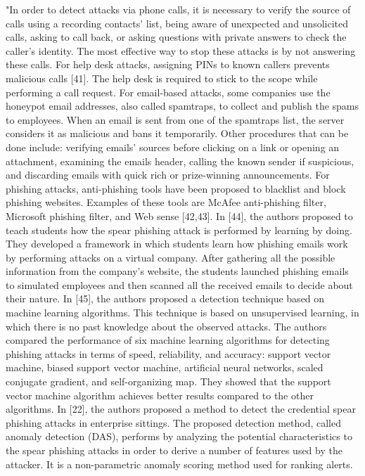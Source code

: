 "In order to detect attacks via phone calls, it is necessary to verify the source of calls using a recording contacts’ list, being aware of unexpected and unsolicited calls, asking to call back, or asking questions with private answers to check the caller’s identity. The most effective way to stop these attacks is by not answering these calls. For help desk attacks, assigning PINs to known callers prevents malicious calls [41]. The help desk is required to stick to the scope while performing a call request. For email-based attacks, some companies use the honeypot email addresses, also called spamtraps, to collect and publish the spams to employees. When an email is sent from one of the spamtraps list, the server considers it as malicious and bans it temporarily. Other procedures that can be done include: verifying emails’ sources before clicking on a link or opening an attachment, examining the emails header, calling the known sender if suspicious, and discarding emails with quick rich or prize-winning announcements.
For phishing attacks, anti-phishing tools have been proposed to blacklist and block phishing websites. Examples of these tools are McAfee anti-phishing filter, Microsoft phishing filter, and Web sense [42,43]. In [44], the authors proposed to teach students how the spear phishing attack is performed by learning by doing. They developed a framework in which students learn how phishing emails work by performing attacks on a virtual company. After gathering all the possible information from the company’s website, the students launched phishing emails to simulated employees and then scanned all the received emails to decide about their nature.
In [45], the authors proposed a detection technique based on machine learning algorithms. This technique is based on unsupervised learning, in which there is no past knowledge about the observed attacks. The authors compared the performance of six machine learning algorithms for detecting phishing attacks in terms of speed, reliability, and accuracy: support vector machine, biased support vector machine, artificial neural networks, scaled conjugate gradient, and self-organizing map. They showed that the support vector machine algorithm achieves better results compared to the other algorithms. In [22], the authors proposed a method to detect the credential spear phishing attacks in enterprise sittings. The proposed detection method, called anomaly detection (DAS), performs by analyzing the potential characteristics to the spear phishing attacks in order to derive a number of features used by the attacker. It is a non-parametric anomaly scoring method used for ranking alerts.
